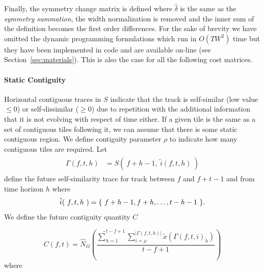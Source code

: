 \documentclass[twocolumn]{article}
\begin{document}
	Finally, the symmetry change matrix is defined where $\hat \delta$ is the same as the \textit{symmetry summation}, the width normalization is removed and the inner sum of the definition becomes the first order differences. For the sake of brevity we have omitted the dynamic programming formulations which run in $O(TW^2)$ time but they have been implemented in code and are available on-line (see Section~\ref{sec:materials}). This is also the case for all the following cost matrices.
	
	\paragraph{Static Contiguity}
	
	Horizontal contiguous traces in $S$ indicate that the track is self-similar (low value $\le 0$) or self-dissimilar ($\ge 0$) due to repetition with the additional information that it is not evolving with respect of time either. If a given tile is the same as a set of contiguous tiles following it, we can assume that there is some static contiguous region. We define contiguity parameter $\rho$ to indicate how many contiguous tiles are required. Let 
\begin{align*}
\begin{array}{ll}
\Gamma( f,t,h ) &= S(~ f + h - 1,~ \tilde{i}(f, t, h) ~)
\end{array}
\end{align*} define the future self-similarity trace for track between $f$ and $f+t-1$ and from time horizon $h$ where 
\begin{dmath*}
\tilde{i}(~f,t,h~) =\\ \{~ f + h - 1, f + h, \ldots, t-h-1 ~ \}.
\end{dmath*}
We define the future contiguity quantity $C$
	
\begin{dmath*}  C(f, t)  =  
\hat N_\Omega \left( \frac{ \tilde	\sum_{h=1}^{t-f+1} 
	\sum_{i=\rho}^{|\Gamma( f,t,h )|} \tilde{x}\left( \Gamma( f,t,i )_{\tilde{h}} \right) }{t-f+1}  \right)
\end{dmath*}  where  
\end{document}
